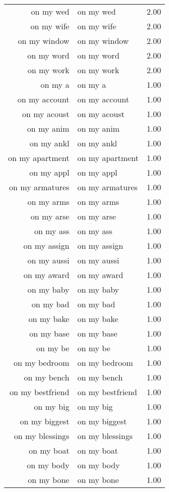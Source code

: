 \begin{table}[ht]
\begin{tabular}{rlr}
  on my wed & on my wed & 2.00 \\ 
  on my wife & on my wife & 2.00 \\ 
  on my window & on my window & 2.00 \\ 
  on my word & on my word & 2.00 \\ 
  on my work & on my work & 2.00 \\ 
  on my a & on my a & 1.00 \\ 
  on my account & on my account & 1.00 \\ 
  on my acoust & on my acoust & 1.00 \\ 
  on my anim & on my anim & 1.00 \\ 
  on my ankl & on my ankl & 1.00 \\ 
  on my apartment & on my apartment & 1.00 \\ 
  on my appl & on my appl & 1.00 \\ 
  on my armatures & on my armatures & 1.00 \\ 
  on my arms & on my arms & 1.00 \\ 
  on my arse & on my arse & 1.00 \\ 
  on my ass & on my ass & 1.00 \\ 
  on my assign & on my assign & 1.00 \\ 
  on my aussi & on my aussi & 1.00 \\ 
  on my award & on my award & 1.00 \\ 
  on my baby & on my baby & 1.00 \\ 
  on my bad & on my bad & 1.00 \\ 
  on my bake & on my bake & 1.00 \\ 
  on my base & on my base & 1.00 \\ 
  on my be & on my be & 1.00 \\ 
  on my bedroom & on my bedroom & 1.00 \\ 
  on my bench & on my bench & 1.00 \\ 
  on my bestfriend & on my bestfriend & 1.00 \\ 
  on my big & on my big & 1.00 \\ 
  on my biggest & on my biggest & 1.00 \\ 
  on my blessings & on my blessings & 1.00 \\ 
  on my boat & on my boat & 1.00 \\ 
  on my body & on my body & 1.00 \\ 
  on my bone & on my bone & 1.00 \\ 

\end{tabular}
\end{table}
